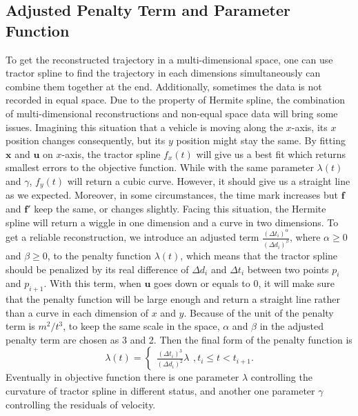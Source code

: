 \subsection{Adjusted Penalty Term and Parameter Function}
To get the reconstructed trajectory in a multi-dimensional space, one can use tractor spline to find the trajectory in each dimensions simultaneously can combine them together at the end. Additionally, sometimes the data is not recorded in equal space. Due to the property of Hermite spline, the combination of multi-dimensional reconstructions and non-equal space data will bring some issues. Imagining this situation that a vehicle is moving along the $x$-axis, its $x$ position changes consequently, but its $y$ position might stay the same. By fitting $\mathbf{x}$ and $\mathbf{u}$ on $x$-axis, the tractor spline $f_x(t)$ will give us a best fit which returns smallest errors to the objective function. While with the same parameter $\lambda(t)$ and $\gamma$, $f_y(t)$ will return a cubic curve. However, it should give us a straight line as we expected. Moreover, in some circumstances, the time mark increases but $\mathbf{f}$ and $\mathbf{f}'$ keep the same, or changes slightly. Facing this situation, the Hermite spline will return a wiggle in one dimension and a curve in two dimensions. To get a reliable reconstruction, we introduce an adjusted term $\frac{(\Delta t_i)^\alpha}{(\Delta d_i)^\beta}$, where $\alpha \ge 0$ and $\beta \ge 0$, to the penalty function $\lambda(t)$, which means that the tractor spline should be penalized by its real difference of $\Delta d_i$ and $\Delta t_i$ between two points $p_i$ and $p_{i+1}$. With this term, when $\mathbf{u}$ goes down or equals to 0, it will make sure that the penalty function will be large enough and return a straight line rather than a curve in each dimension of $x$ and $y$. Because of the unit of the penalty term is $m^2/t^3$, to keep the same scale in the space, $\alpha$ and $\beta$ in the adjusted penalty term are chosen as 3 and 2. Then the final form of the penalty function is
\begin{equation}\label{adjustedpenalty}
\lambda(t)=\begin{cases}
\frac{(\Delta t_i)^3}{(\Delta d_i)^2}\lambda
\end{cases}, t_i\leq t < t_{i+1}.
\end{equation}
Eventually in objective function there is one parameter $\lambda$ controlling the curvature of tractor spline in different status, and another one parameter $\gamma$ controlling the residuals of velocity. 

